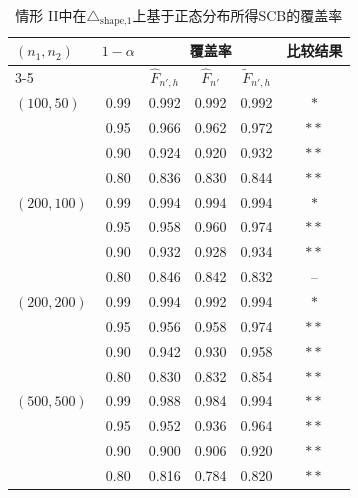 \documentclass[a4paper,openay,14pt]{ctexbook}
\numberwithin{equation}{section}
\numberwithin{lem}{section}
\begin{document}
\begin{table}[tph]
\caption{情形 II中在$\triangle_{\text{shape,1}}$上基于正态分布所得SCB的覆盖率}
\label{TAB:coveragerate-N(0,1)-irregular1}
\centering
\begin{tabular}{lccccc}
\toprule
\multirow{2}{*}{$(n_1,n_2)$} & \multirow{2}{*}{$1-\alpha$} & \multicolumn{3}{c}{覆盖率} & \multirow{2}{*}{比较结果} \\ 
\cmidrule{3-5}
& & $\hat{F}_{n', h}$ & $\hat{F}_{n'}$ & $\tilde{F}_{n', h}$ & \\ 
\midrule
$(100,50)$  & 0.99 & 0.992 & 0.992 & 0.992 & $\ast$ \\
            & 0.95 & 0.966 & 0.962 & 0.972 &  $\ast\ast$ \\
            & 0.90 & 0.924 & 0.920 & 0.932 &  $\ast\ast$ \\
            & 0.80 & 0.836 & 0.830 & 0.844 & $\ast\ast$ \\ \addlinespace
$(200,100)$ & 0.99 & 0.994 & 0.994 & 0.994 & $\ast$ \\
            & 0.95 & 0.958 & 0.960 & 0.974 & $\ast\ast$ \\
            & 0.90 & 0.932 & 0.928 & 0.934 & $\ast\ast$ \\
            & 0.80 & 0.846 & 0.842 & 0.832 & -- \\ \addlinespace
$(200,200)$ & 0.99 & 0.994 & 0.992 & 0.994 & $\ast$ \\
            & 0.95 & 0.956 & 0.958 & 0.974 & $\ast\ast$ \\
            & 0.90 & 0.942 & 0.930 & 0.958 & $\ast\ast$ \\
            & 0.80 & 0.830 & 0.832 & 0.854 & $\ast\ast$ \\ \addlinespace
$(500,500)$ & 0.99 & 0.988 & 0.984 & 0.994 & $\ast\ast$ \\
            & 0.95 & 0.952 & 0.936 & 0.964 & $\ast\ast$ \\
            & 0.90 & 0.900 & 0.906 & 0.920 & $\ast\ast$ \\
            & 0.80 & 0.816 & 0.784 & 0.820 & $\ast\ast$ \\ 
\bottomrule
\end{tabular}
\end{table}
\end{document}
